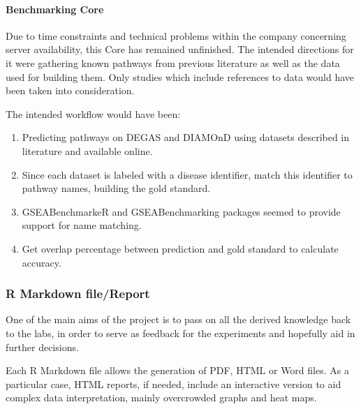 \paragraph{Benchmarking Core}
Due to time constraints and technical problems within the company concerning server availability, this Core has remained unfinished.
The intended directions for it were gathering known pathways from previous literature as well as the data used for building them. Only studies which include references to data would have been taken into consideration.

The intended workflow would have been:
\begin{enumerate}
    \item Predicting pathways on DEGAS and DIAMOnD using datasets described in literature and available online.
    \item Since each dataset is labeled with a disease identifier, match this identifier to pathway names, building the gold standard.
    \item GSEABenchmarkeR and GSEABenchmarking packages seemed to provide support for name matching.
    \item Get overlap percentage between prediction and gold standard to calculate accuracy.
\end{enumerate}

\subsubsection{R Markdown file/Report}
One of the main aims of the project is to pass on all the derived knowledge back to the labs, in order to serve as feedback for the experiments and hopefully aid in further decisions.

Each R Markdown file allows the generation of PDF, HTML or Word files. As a particular case, HTML reports, if needed, include an interactive version to aid complex data interpretation, mainly overcrowded graphs and heat maps.